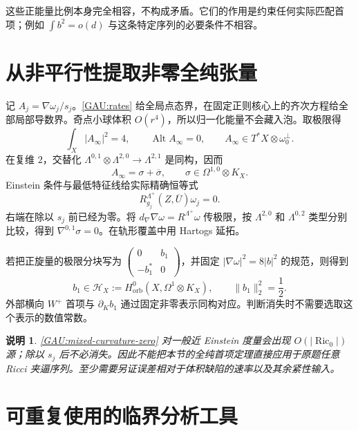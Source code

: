 \documentclass[UTF8,fontset=fandol,zihao=-4,oneside,openany]{ctexbook}
\theoremstyle{cjkplain}
\newtheorem{remark}[theorem]{说明}
\numberwithin{equation}{chapter}
\begin{document}
这些正能量比例本身完全相容，不构成矛盾。它们的作用是约束任何实际匹配首项；例如 $\int b^2=o(d)$ 与这条特定序列的必要条件不相容。

\section{从非平行性提取非零全纯张量}
\label{GAU:holomorphic-first}

记 $A_j=\nabla\omega_j/s_j$。\eqref{GAU:rates} 给全局点态界，在固定正则核心上的齐次方程给全部局部导数界。奇点小球体积 $O(r^4)$，所以归一化能量不会藏入泡。取极限得
\[
\int_X|A_\infty|^2=4,\qquad
\operatorname{Alt}A_\infty=0,\qquad
A_\infty\in T^*X\otimes\omega_0^\perp.
\]
在复维 $2$，交替化
$\Lambda^{0,1}\otimes\Lambda^{2,0}\to\Lambda^{2,1}$ 是同构，因而
\[
A_\infty=\sigma+\overline\sigma,\qquad
\sigma\in\Omega^{1,0}\otimes K_X.
\]
Einstein 条件与最低特征线给实际精确恒等式
\begin{equation}\label{GAU:mixed-curvature-zero}
R^{\Lambda^+}_{g_j}(Z,\overline U)\omega_j=0.
\end{equation}
右端在除以 $s_j$ 前已经为零。将 $d_\nabla\nabla\omega=R^{\Lambda^+}\omega$ 传极限，按 $\Lambda^{2,0}$ 和 $\Lambda^{0,2}$ 类型分别比较，得到 $\nabla^{0,1}\sigma=0$。在轨形覆盖中用 Hartogs 延拓。

若把正旋量的极限分块写为
$\left(\begin{smallmatrix}0&b_1\\-b_1^*&0\end{smallmatrix}\right)$，并固定
$|\nabla\omega|^2=8|b|^2$ 的规范，则得到
\begin{equation}\label{GAU:b-nonzero}
b_1\in\mathcal H_X:=H^0_{\mathrm{orb}}(X,\Omega^1\otimes K_X),
\qquad \|b_1\|_2^2=\frac12.
\end{equation}
外部横向 $W^+$ 首项与 $\partial_Kb_1$ 通过固定非零表示同构对应。判断消失时不需要选取这个表示的数值常数。

\begin{remark}
\eqref{GAU:mixed-curvature-zero} 对一般近 Einstein 度量会出现 $O(|\operatorname{Ric}_0|)$ 源；除以 $s_j$ 后不必消失。因此不能把本节的全纯首项定理直接应用于原题任意 Ricci 夹逼序列。至少需要另证误差相对于体积缺陷的速率以及其余紧性输入。
\end{remark}

\section{可重复使用的临界分析工具}
\label{GAU:tools}
\end{document}
